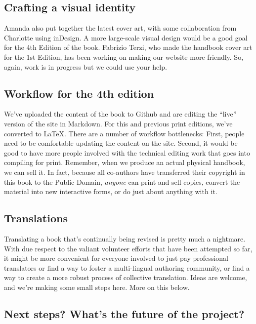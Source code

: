 \subsection{Crafting a visual identity}\label{crafting-a-visual-identity}

Amanda also put together the latest cover art, with some collaboration
from Charlotte using inDesign. A more large-scale visual design would be
a good goal for the 4th Edition of the book. Fabrizio Terzi, who made
the handbook cover art for the 1st Edition, has been working on making
our website more friendly. So, again, work is in progress but we could
use your help.

\subsection{Workflow for the 4th edition}\label{workflow-for-the-4th-edition}

We've uploaded the content of the book to Github and are editing the
``live'' version of the site in Markdown. For this and previous print
editions, we've converted to LaTeX. There are a number of workflow
bottlenecks: First, people need to be comfortable updating the content
on the site. Second, it would be good to have more people involved with
the technical editing work that goes into compiling for print. Remember,
when we produce an actual physical handbook, we can sell it. In fact,
because all co-authors have transferred their copyright in this book to
the Public Domain, \emph{anyone} can print and sell copies, convert the
material into new interactive forms, or do just about anything with it.

\subsection{Translations}\label{translations}

Translating a book that's continually being revised is pretty much a
nightmare. With due respect to the valiant volunteer efforts that have
been attempted so far, it might be more convenient for everyone involved
to just pay professional translators or find a way to foster a
multi-lingual authoring community, or find a way to create a more robust
process of collective translation. Ideas are welcome, and we're making
some small steps here. More on this below.

\subsection{Next steps? What's the future of the project?}\label{next-steps-whats-the-future-of-the-project}

